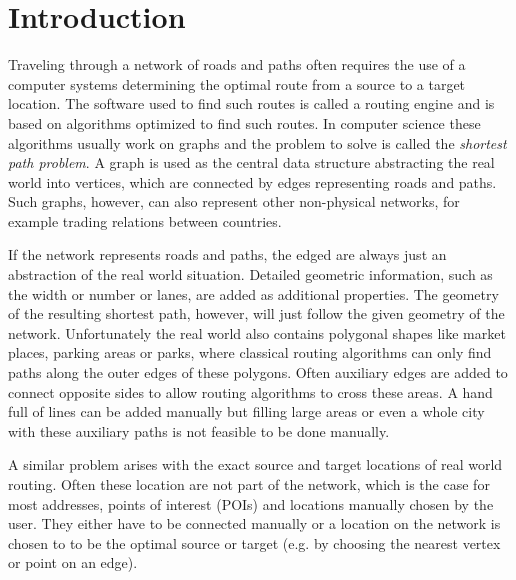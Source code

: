 \documentclass[
	11pt,
	a4paper,
	usegeometry,
	twoside,
	openright,
	toc=chapterentrywithdots
]{scrbook}
\newcommand{\citationNeeded}{\todo[backgroundcolor=red,textcolor=white,linecolor=red]{citation needed}}
\begin{document}
	
	

	\restoregeometry
	
	\tableofcontents
	\thispagestyle{empty}
	\newpage
	
	\listoftodos
	\newpage
	
	\chapter{Introduction}
	
		Traveling through a network of roads and paths often requires the use of a computer systems determining the optimal route from a source to a target location.
		The software used to find such routes is called a routing engine and is based on algorithms optimized to find such routes.
		In computer science these algorithms usually work on graphs and the problem to solve is called the \textit{shortest path problem}.
		A graph is used as the central data structure abstracting the real world into vertices, which are connected by edges representing roads and paths.
		Such graphs, however, can also represent other non-physical networks, for example trading relations between countries\citationNeeded.
		
		If the network represents roads and paths, the edged are always just an abstraction of the real world situation.
		Detailed geometric information, such as the width or number or lanes, are added as additional properties.
		The geometry of the resulting shortest path, however, will just follow the given geometry of the network.
		Unfortunately the real world also contains polygonal shapes like market places, parking areas or parks, where classical routing algorithms can only find paths along the outer edges of these polygons.
		Often auxiliary edges are added to connect opposite sides to allow routing algorithms to cross these areas.
		A hand full of lines can be added manually but filling large areas or even a whole city with these auxiliary paths is not feasible to be done manually.
		
		A similar problem arises with the exact source and target locations of real world routing.
		Often these location are not part of the network, which is the case for most addresses, points of interest (POIs) and locations manually chosen by the user.
		They either have to be connected manually or a location on the network is chosen to to be the optimal source or target (e.g. by choosing the nearest  vertex or point on an edge).
		
\end{document}

